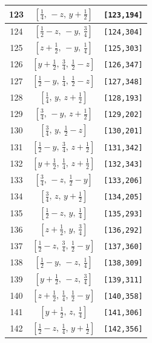 \documentclass[fleqn,8pt]{jsarticle}
\begin{document}
\begin{longtable}{ccc}
123 & $\left[ \frac{1}{4},\, - z,\, y + \frac{1}{2} \right]$ & {\tt [123,194]} \\ \hline
124 & $\left[ \frac{1}{2} - z,\, - y,\, \frac{3}{4} \right]$ & {\tt [124,304]} \\ \hline
125 & $\left[ z + \frac{1}{2},\, - y,\, \frac{1}{4} \right]$ & {\tt [125,303]} \\ \hline
126 & $\left[ y + \frac{1}{2},\, \frac{3}{4},\, \frac{1}{2} - z \right]$ & {\tt [126,347]} \\ \hline
127 & $\left[ \frac{1}{2} - y,\, \frac{1}{4},\, \frac{1}{2} - z \right]$ & {\tt [127,348]} \\ \hline
128 & $\left[ \frac{1}{4},\, y,\, z + \frac{1}{2} \right]$ & {\tt [128,193]} \\ \hline
129 & $\left[ \frac{3}{4},\, - y,\, z + \frac{1}{2} \right]$ & {\tt [129,202]} \\ \hline
130 & $\left[ \frac{3}{4},\, y,\, \frac{1}{2} - z \right]$ & {\tt [130,201]} \\ \hline
131 & $\left[ \frac{1}{2} - y,\, \frac{3}{4},\, z + \frac{1}{2} \right]$ & {\tt [131,342]} \\ \hline
132 & $\left[ y + \frac{1}{2},\, \frac{1}{4},\, z + \frac{1}{2} \right]$ & {\tt [132,343]} \\ \hline
133 & $\left[ \frac{3}{4},\, - z,\, \frac{1}{2} - y \right]$ & {\tt [133,206]} \\ \hline
134 & $\left[ \frac{3}{4},\, z,\, y + \frac{1}{2} \right]$ & {\tt [134,205]} \\ \hline
135 & $\left[ \frac{1}{2} - z,\, y,\, \frac{1}{4} \right]$ & {\tt [135,293]} \\ \hline
136 & $\left[ z + \frac{1}{2},\, y,\, \frac{3}{4} \right]$ & {\tt [136,292]} \\ \hline
137 & $\left[ \frac{1}{2} - z,\, \frac{3}{4},\, \frac{1}{2} - y \right]$ & {\tt [137,360]} \\ \hline
138 & $\left[ \frac{1}{2} - y,\, - z,\, \frac{1}{4} \right]$ & {\tt [138,309]} \\ \hline
139 & $\left[ y + \frac{1}{2},\, - z,\, \frac{3}{4} \right]$ & {\tt [139,311]} \\ \hline
140 & $\left[ z + \frac{1}{2},\, \frac{1}{4},\, \frac{1}{2} - y \right]$ & {\tt [140,358]} \\ \hline
141 & $\left[ y + \frac{1}{2},\, z,\, \frac{1}{4} \right]$ & {\tt [141,306]} \\ \hline
142 & $\left[ \frac{1}{2} - z,\, \frac{1}{4},\, y + \frac{1}{2} \right]$ & {\tt [142,356]} \\ \hline

\end{longtable}
\end{document}
